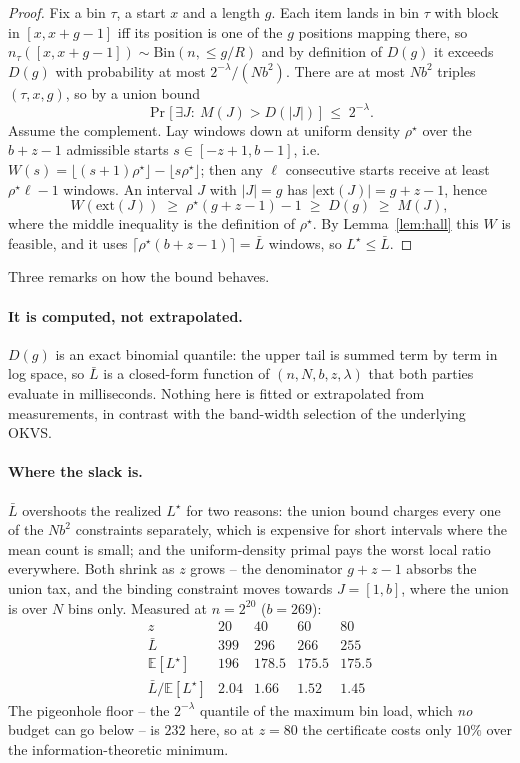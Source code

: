 \begin{proof}
Fix a bin $\tau$, a start $x$ and a length $g$. Each item lands in bin $\tau$
with block in $[x, x+g-1]$ iff its position is one of the $g$ positions mapping
there, so $n_\tau([x,x+g-1]) \sim \mathrm{Bin}(n, \le g/R)$ and by definition of
$D(g)$ it exceeds $D(g)$ with probability at most $2^{-\lambda}/(N b^2)$. There
are at most $N b^2$ triples $(\tau, x, g)$, so by a union bound
\begin{equation}
  \label{eq:allJ}
  \Pr\big[\, \exists J:\ M(J) > D(|J|) \,\big] \;\le\; 2^{-\lambda}.
\end{equation}
Assume the complement. Lay windows down at uniform density $\rho^\star$ over
the $b+z-1$ admissible starts $s \in [-z+1, b-1]$, i.e.
$W(s) = \lfloor (s+1)\rho^\star \rfloor - \lfloor s \rho^\star \rfloor$; then
any $\ell$ consecutive starts receive at least $\rho^\star \ell - 1$ windows.
An interval $J$ with $|J| = g$ has $|\mathrm{ext}(J)| = g+z-1$, hence
\[
  W(\mathrm{ext}(J)) \;\ge\; \rho^\star (g+z-1) - 1 \;\ge\; D(g) \;\ge\; M(J),
\]
where the middle inequality is the definition of $\rho^\star$. By
Lemma~\ref{lem:hall} this $W$ is feasible, and it uses
$\lceil \rho^\star (b+z-1) \rceil = \bar{L}$ windows, so
$L^\star \le \bar{L}$.
\end{proof}

Three remarks on how the bound behaves.

\paragraph{It is computed, not extrapolated.}
$D(g)$ is an exact binomial quantile: the upper tail is summed term by term in
log space, so $\bar{L}$ is a closed-form function of $(n, N, b, z, \lambda)$
that both parties evaluate in milliseconds. Nothing here is fitted or
extrapolated from measurements, in contrast with the band-width selection of
the underlying OKVS.

\paragraph{Where the slack is.}
$\bar{L}$ overshoots the realized $L^\star$ for two reasons: the union bound
charges every one of the $Nb^2$ constraints separately, which is expensive for
short intervals where the mean count is small; and the uniform-density primal
pays the worst local ratio everywhere. Both shrink as $z$ grows -- the
denominator $g+z-1$ absorbs the union tax, and the binding constraint moves
towards $J = [1,b]$, where the union is over $N$ bins only. Measured at
$n = 2^{20}$ ($b = 269$):
\[
  \begin{array}{c|cccc}
    z & 20 & 40 & 60 & 80 \\ \hline
    \bar{L} & 399 & 296 & 266 & 255 \\
    \mathbb{E}[L^\star] & 196 & 178.5 & 175.5 & 175.5 \\
    \bar{L} / \mathbb{E}[L^\star] & 2.04 & 1.66 & 1.52 & 1.45
  \end{array}
\]
The pigeonhole floor -- the $2^{-\lambda}$ quantile of the maximum bin load,
which \emph{no} budget can go below -- is $232$ here, so at $z = 80$ the
certificate costs only $10\%$ over the information-theoretic minimum.

